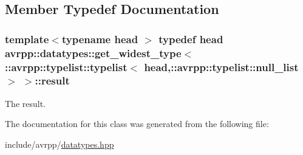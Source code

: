 \subsection{Member Typedef Documentation}
\hypertarget{classavrpp_1_1datatypes_1_1get__widest__type_3_01_1_1avrpp_1_1typelist_1_1typelist_3_01head_00_17d8c55404f4f223d4953ba4d90da08b2_a8eed602d964b7fa0c8ff2919786141bc}{
\subsubsection[{result}]{\setlength{\rightskip}{0pt plus 5cm}template$<$typename head $>$ typedef head avrpp::datatypes::get\_\-widest\_\-type$<$ ::{\bf avrpp::typelist::typelist}$<$ head,::{\bf avrpp::typelist::null\_\-list} $>$ $>$::{\bf result}}}
\label{classavrpp_1_1datatypes_1_1get__widest__type_3_01_1_1avrpp_1_1typelist_1_1typelist_3_01head_00_17d8c55404f4f223d4953ba4d90da08b2_a8eed602d964b7fa0c8ff2919786141bc}


The result. 



The documentation for this class was generated from the following file:\begin{DoxyCompactItemize}
\item 
include/avrpp/\hyperlink{datatypes_8hpp}{datatypes.hpp}\end{DoxyCompactItemize}
